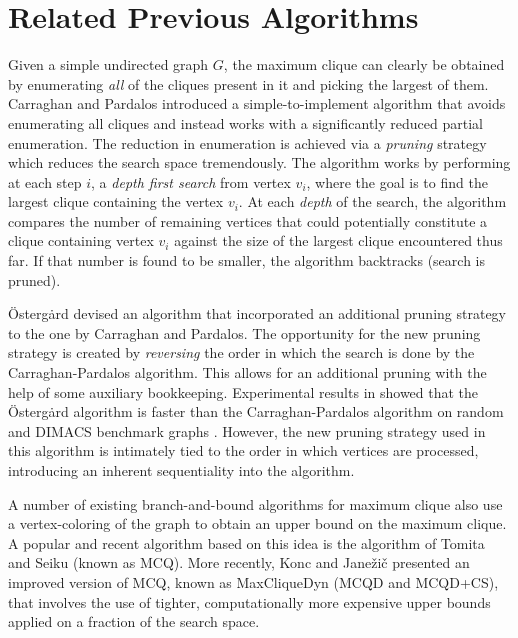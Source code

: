 \section{Related Previous Algorithms}
\label{sec:relatedwork}

Given a simple undirected graph $G$, the maximum clique can clearly be obtained by enumerating 
{\em all} of the cliques present in it and picking the largest of them.
Carraghan and Pardalos \cite{pardalos} introduced a simple-to-implement
algorithm that avoids enumerating all cliques and instead
works with a significantly reduced partial enumeration.
The reduction in enumeration is achieved via 
a {\em pruning} strategy which reduces the search space tremendously.
The algorithm works by
performing at each step $i$, a {\em depth first search} from vertex $v_i$, 
where the goal is to find the largest clique containing the vertex $v_i$.
At each {\em depth} of the search, the algorithm compares the number of remaining
vertices that could potentially constitute a clique containing vertex $v_i$
against the size of the largest clique encountered thus far.
If that number is found to be smaller, the algorithm backtracks (search is pruned).

\"{O}sterg\.{a}rd \cite{ostergard} devised an algorithm that incorporated an additional 
pruning strategy to the one by Carraghan and Pardalos.
The opportunity for the new pruning strategy is created by {\em reversing} the order in which the search is done by
the Carraghan-Pardalos algorithm. This allows for an additional pruning with the help of
some auxiliary bookkeeping. 
Experimental results in \cite{ostergard} showed that the \"{O}sterg\.{a}rd
algorithm is faster than the Carraghan-Pardalos algorithm on random and 
DIMACS benchmark graphs \cite{dimacs}.
However, the new pruning strategy used in this algorithm is intimately tied to the order in which vertices are processed, introducing an inherent sequentiality into the algorithm.

A number of existing branch-and-bound algorithms for maximum clique
also use a vertex-coloring of the graph to obtain an upper bound on the maximum clique. 
A popular and recent algorithm based on this idea is 
the algorithm of Tomita and Seiku \cite{citeulike:7905505} (known as MCQ). 
More recently, Konc and Jane\v{z}i\v{c} \cite{konc2007improved} presented 
an improved version of MCQ, known as MaxCliqueDyn (MCQD and MCQD+CS), that
involves the use of tighter, computationally more expensive upper bounds 
applied on a fraction of the search space.


